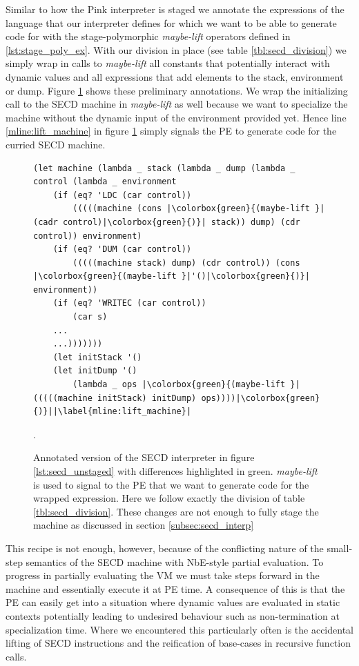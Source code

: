 \documentclass[a4paper,12pt,twoside,openright]{report}
\theoremstyle{definition}
\begin{document}
Similar to how the Pink interpreter is staged \cite{amin2017collapsing} we annotate the expressions of the language that our interpreter defines for which we want to be able to generate code for with the stage-polymorphic \textit{maybe-lift} operators defined in \ref{lst:stage_poly_ex}. With our division in place (see table \ref{tbl:secd_division}) we simply wrap in calls to \textit{maybe-lift} all constants that potentially interact with dynamic values and all expressions that add elements to the stack, environment or dump. Figure \ref{lst:secd_staged1} shows these preliminary annotations. We wrap the initializing call to the SECD machine in \textit{maybe-lift} as well because we want to specialize the machine without the dynamic input of the environment provided yet. Hence line \ref{mline:lift_machine} in figure \ref{lst:secd_staged1} simply signals the PE to generate code for the curried SECD machine.

\begin{figure}[ht]
\centering
\begin{verbatim}
(let machine (lambda _ stack (lambda _ dump (lambda _ control (lambda _ environment
    (if (eq? 'LDC (car control))
        (((((machine (cons |\colorbox{green}{(maybe-lift }|(cadr control)|\colorbox{green}{)}| stack)) dump) (cdr control)) environment)
    (if (eq? 'DUM (car control))
        (((((machine stack) dump) (cdr control)) (cons |\colorbox{green}{(maybe-lift }|'()|\colorbox{green}{)}| environment))
    (if (eq? 'WRITEC (car control))
        (car s)
    ...
    ...)))))))
    (let initStack '()
    (let initDump '()
        (lambda _ ops |\colorbox{green}{(maybe-lift }|(((((machine initStack) initDump) ops))))|\colorbox{green}{)}||\label{mline:lift_machine}|
\end{verbatim}
\caption{Annotated version of the SECD interpreter in figure \ref{lst:secd_unstaged} with differences highlighted in green. \textit{maybe-lift} is used to signal to the PE that we want to generate code for the wrapped expression. Here we follow exactly the division of table \ref{tbl:secd_division}. These changes are not enough to fully stage the machine as discussed in section \ref{subsec:secd_interp}}.
\label{lst:secd_staged1}
\end{figure}

This recipe is not enough, however, because of the conflicting nature of the small-step semantics of the SECD machine with NbE-style partial evaluation. To progress in partially evaluating the VM we must take steps forward in the machine and essentially execute it at PE time. A consequence of this is that the PE can easily get into a situation where dynamic values are evaluated in static contexts potentially leading to undesired behaviour such as non-termination at specialization time. Where we encountered this particularly often is the accidental lifting of SECD instructions and the reification of base-cases in recursive function calls.
\end{document}
